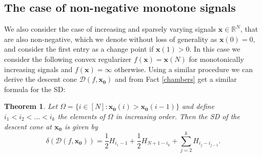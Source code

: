 \documentclass[11pt]{article}
\newcommand{\be}{\begin{equation}}
\newcommand{\ee}{\end{equation}}
\newtheorem{lemma}[proposition]{Lemma}
\newtheorem{theorem}[proposition]{Theorem}
\begin{document}
\subsection{The case of non-negative monotone signals}
We also consider the case of increasing and sparsely varying signals $\bm{x} \in\mathbb{R}^N$, that are also non-negative, which we denote without loss of generality as $\bm{x}(0)=0$, and consider the first entry as a change point if $\bm{x}(1)>0$. In this case we consider the following convex regularizer $f(\bm{x}) = \bm{x}(N)$ for monotonically increasing signals and $f(\bm{x}) =\infty$ otherwise.
%
Using a similar procedure we can derive the descent cone $\mathcal{D}(f,\bm{x_0})$ and from Fact \ref{chambers} get a similar formula for the SD:
\begin{theorem}
Let $\Omega = \{ i \in [N] : \bm{x_0}(i) > \bm{x_0}(i-1) \}$ and define $i_1 < i_2 < \ldots < i_k$ the elements of $\Omega$ in increasing order. %
Then the SD of the descent cone at $\bm{x_0}$ is given by
\[%
	\delta(\mathcal{D}(f,\bm{x_0})) = \dfrac{1}{2}H_{i_1-1} + \dfrac{1}{2}H_{N+1-i_k} + \sum_{j=2}^{k}H_{i_j-i_{j-1}}.
\]%
\end{theorem}
\end{document}
